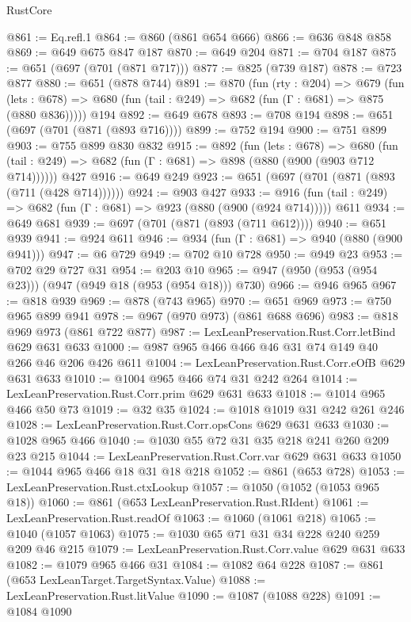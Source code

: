 \begin{lexlean}{RustCore}
\begin{coremodule}
@861 := Eq.refl.{1}
@864 := @860 (@861 @654 @666)
@866 := @636 @848 @858
@869 := @649 @675 @847 @187
@870 := @649 @204
@871 := @704 @187
@875 := @651 (@697 (@701 (@871 @717)))
@877 := @825 (@739 @187)
@878 := @723 @877
@880 := @651 (@878 @744)
@891 := @870
    (fun (rty : @204) =>
    @679
      (fun (lets : @678) => @680 (fun (tail : @249) => @682 (fun (Γ : @681) => @875 (@880 @836)))))
    @194
@892 := @649 @678
@893 := @708 @194
@898 := @651 (@697 (@701 (@871 (@893 @716))))
@899 := @752 @194
@900 := @751 @899
@903 := @755 @899 @830 @832
@915 := @892
    (fun (lets : @678) =>
    @680 (fun (tail : @249) => @682 (fun (Γ : @681) => @898 (@880 (@900 (@903 @712 @714))))))
    @427
@916 := @649 @249
@923 := @651 (@697 (@701 (@871 (@893 (@711 (@428 @714))))))
@924 := @903 @427
@933 := @916 (fun (tail : @249) => @682 (fun (Γ : @681) => @923 (@880 (@900 (@924 @714))))) @611
@934 := @649 @681
@939 := @697 (@701 (@871 (@893 (@711 @612))))
@940 := @651 @939
@941 := @924 @611
@946 := @934 (fun (Γ : @681) => @940 (@880 (@900 @941)))
@947 := @6 @729
@949 := @702 @10 @728
@950 := @949 @23
@953 := @702 @29 @727 @31
@954 := @203 @10
@965 := @947 (@950 (@953 (@954 @23))) (@947 (@949 @18 (@953 (@954 @18))) @730)
@966 := @946 @965
@967 := @818 @939
@969 := @878 (@743 @965)
@970 := @651 @969
@973 := @750 @965 @899 @941
@978 := @967 (@970 @973) (@861 @688 @696)
@983 := @818 @969 @973 (@861 @722 @877)
@987 := LexLeanPreservation.Rust.Corr.letBind @629 @631 @633
@1000 := @987 @965 @466 @466 @46 @31 @74 @149 @40 @266 @46 @206 @426 @611
@1004 := LexLeanPreservation.Rust.Corr.eOfB @629 @631 @633
@1010 := @1004 @965 @466 @74 @31 @242 @264
@1014 := LexLeanPreservation.Rust.Corr.prim @629 @631 @633
@1018 := @1014 @965 @466 @50 @73
@1019 := @32 @35
@1024 := @1018 @1019 @31 @242 @261 @246
@1028 := LexLeanPreservation.Rust.Corr.opsCons @629 @631 @633
@1030 := @1028 @965 @466
@1040 := @1030 @55 @72 @31 @35 @218 @241 @260 @209 @23 @215
@1044 := LexLeanPreservation.Rust.Corr.var @629 @631 @633
@1050 := @1044 @965 @466 @18 @31 @18 @218
@1052 := @861 (@653 @728)
@1053 := LexLeanPreservation.Rust.ctxLookup
@1057 := @1050 (@1052 (@1053 @965 @18))
@1060 := @861 (@653 LexLeanPreservation.Rust.RIdent)
@1061 := LexLeanPreservation.Rust.readOf
@1063 := @1060 (@1061 @218)
@1065 := @1040 (@1057 @1063)
@1075 := @1030 @65 @71 @31 @34 @228 @240 @259 @209 @46 @215
@1079 := LexLeanPreservation.Rust.Corr.value @629 @631 @633
@1082 := @1079 @965 @466 @31
@1084 := @1082 @64 @228
@1087 := @861 (@653 LexLeanTarget.TargetSyntax.Value)
@1088 := LexLeanPreservation.Rust.litValue
@1090 := @1087 (@1088 @228)
@1091 := @1084 @1090

\end{coremodule}
\end{lexlean}
